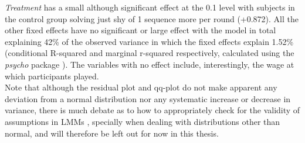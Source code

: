 \textit{Treatment} has a small although significant effect at the 0.1 level with subjects in the control group solving just shy of 1 sequence more per round (+0.872). All the other fixed effects have no significant or large effect with the model in total explaining 42\% of the observed variance in which the fixed effects explain 1.52\% (conditional R-squared and marginal r-squared respectively, calculated using the \textit{psycho} package \citep{makowski2018}). The variables with no effect include, interestingly, the wage at which participants played.\\

Note that although the residual plot and qq-plot do not make apparent any deviation from a normal distribution nor any systematic increase or decrease in variance, there is much debate as to how to appropriately check for the validity of assumptions in LMMs  \citep{loy2017}, specially when dealing with distributions other than normal, and will therefore be left out for now in this thesis.\\

